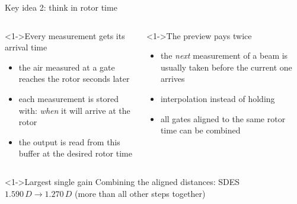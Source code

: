 \begin{frame}{Key idea 2: think in rotor time}
	\begin{columns}[T]
		\column{7.0cm}
		\begin{block}<1->{Every measurement gets its arrival time}
			\begin{itemize}
				\item the air measured at a gate reaches the rotor seconds later
				\item each measurement is stored with: \emph{when} it will arrive at the rotor
				\item the output is read from this buffer at the desired rotor time
			\end{itemize}
		\end{block}
		\column{7.0cm}
		\begin{block}<1->{The preview pays twice}
			\begin{itemize}
				\item the \emph{next} measurement of a beam is usually taken before the current one arrives
				\item  interpolation instead of holding
				\item all gates aligned to the same rotor time can be combined
			\end{itemize}
		\end{block}
	\end{columns}
	\begin{alertblock}<1->{Largest single gain}
		Combining the aligned distances: SDES $1.590\,D \rightarrow 1.270\,D$ (more than all other steps together)
	\end{alertblock}
\end{frame}
